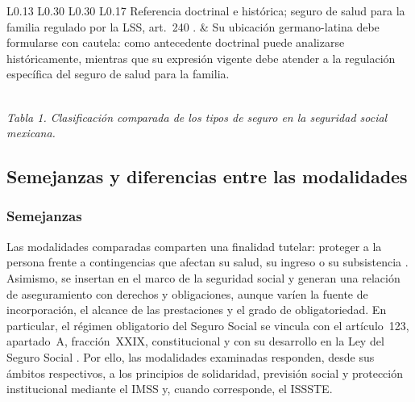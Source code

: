 \documentclass[12pt,letterpaper,oneside]{article}
\begin{document}
\begin{landscape}
\begin{center}
{{\begin{tabular}{L{0.13\linewidth} L{0.30\linewidth} L{0.30\linewidth} L{0.17\linewidth}}
Referencia doctrinal e histórica; seguro de salud para la familia regulado por la LSS, art.~240 \citep{lss2026,bricenoRuiz2011}. &
Su ubicación germano-latina debe formularse con cautela: como antecedente doctrinal puede analizarse históricamente, mientras que su expresión vigente debe atender a la regulación específica del seguro de salud para la familia. \\
\bottomrule
\end{tabular}%
}\\[0.18cm]
{\footnotesize\textit{Tabla 1. Clasificación comparada de los tipos de seguro en la seguridad social mexicana.}}
}
\end{center}
\end{landscape}

\subsection{Semejanzas y diferencias entre las modalidades}

\subsubsection*{Semejanzas}
Las modalidades comparadas comparten una finalidad tutelar: proteger a la persona frente a contingencias que afectan su salud, su ingreso o su subsistencia \citep{bricenoRuiz2011}. Asimismo, se insertan en el marco de la seguridad social y generan una relación de aseguramiento con derechos y obligaciones, aunque varíen la fuente de incorporación, el alcance de las prestaciones y el grado de obligatoriedad. En particular, el régimen obligatorio del Seguro Social se vincula con el artículo~123, apartado~A, fracción~XXIX, constitucional y con su desarrollo en la Ley del Seguro Social \citep{cpeum2026,lss2026}. Por ello, las modalidades examinadas responden, desde sus ámbitos respectivos, a los principios de solidaridad, previsión social y protección institucional mediante el IMSS y, cuando corresponde, el ISSSTE.
\end{document}

